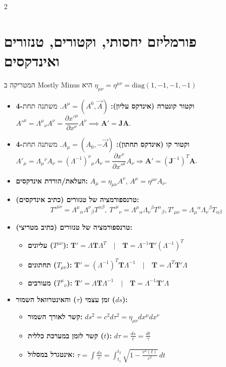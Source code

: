 \documentclass[10pt,a4paper]{article}
\begin{document}
\fontsize{10pt}{12pt}\selectfont

\begin{multicols*}{2}

\section{פורמליזם יחסותי, וקטורים, טנזורים ואינדקסים}
המטריקה ב \textenglish{Mostly Minus} היא 
$
\eta_{\mu\nu} = \eta^{\mu\nu} = \text{diag}(1, -1, -1, -1)
$
\begin{itemize}
    \item \textbf{4-וקטור קונטרה (אינדקס עליון):} $A^\mu = (A^0, \vec{A})$. משתנה תחת $A'^\mu = \Lambda^\mu{}_\nu A^\nu = \dfrac{\partial x'^\mu}{\partial x^\nu} A^\nu \implies \mathbf{A}' = \mathbf{J} \mathbf{A}$.
    \item \textbf{4-וקטור קו (אינדקס תחתון):} $A_\mu=(A_0, -\vec{A})$. משתנה תחת $A'_\mu =\Lambda_\mu{}^\nu A_\nu = (\Lambda^{-1})^\nu{}_\mu A_\nu = \dfrac{\partial x^\nu}{\partial x'^\mu} A_\nu \Rightarrow \mathbf{A}' = (\mathbf{J}^{-1})^T \mathbf{A}$.
    \item \textbf{העלאת/הורדת אינדקסים:} $A_\mu = \eta_{\mu\nu} A^\nu$, $A^\mu = \eta^{\mu\nu} A_\nu$.
    \item \textbf{טרנספורמציה של טנזורים (כתיב אינדקסים):} 
    \[
    T'^{\mu\nu} = \Lambda^\mu{}_\alpha \Lambda^\nu{}_\beta T^{\alpha\beta}, \
    T'^\mu{}_\nu = \Lambda^\mu{}_\alpha \Lambda_\nu{}^\beta T^\alpha{}_\beta, 
    T'_{\mu\nu} = \Lambda_\mu{}^\alpha \Lambda_\nu{}^\beta T_{\alpha\beta}
    \]

    \item \textbf{טרנספורמציה של טנזורים (כתיב מטריצי):}
    \begin{itemize}
        \item \textbf{עליונים ($T^{\mu\nu}$):} $\mathbf{T}' = \Lambda \mathbf{T} \Lambda^T \quad | \quad \mathbf{T} = \Lambda^{-1} \mathbf{T}' (\Lambda^{-1})^T$
        \item \textbf{תחתונים ($T_{\mu\nu}$):} $\mathbf{T}' = (\Lambda^{-1})^T \mathbf{T} \Lambda^{-1} \quad | \quad \mathbf{T} = \Lambda^T \mathbf{T}' \Lambda$
        \item \textbf{מעורבים ($T^\mu{}_\nu$):} $\mathbf{T}' = \Lambda \mathbf{T} \Lambda^{-1} \quad | \quad \mathbf{T} = \Lambda^{-1} \mathbf{T}' \Lambda$
    \end{itemize}

\item \textbf{זמן עצמי ($\tau$) והאינטרוואל השמור ($ds$):}
\begin{itemize}
    \item \textbf{קשר לאורך השמור:} $ds^2 = c^2 d\tau^2 = \eta_{\mu\nu} dx^\mu dx^\nu$
    \item \textbf{קשר לזמן במערכת כללית ($t$):} $d\tau = \frac{ds}{c} = \frac{dt}{\gamma}$
    \item \textbf{אינטגרל במסלול:} $\tau = \int \frac{ds}{c} = \int_{t_1}^{t_2} \sqrt{1 - \frac{v^2(t)}{c^2}} \, dt$
\end{itemize}


\end{itemize}
\end{multicols*}
\end{document}

